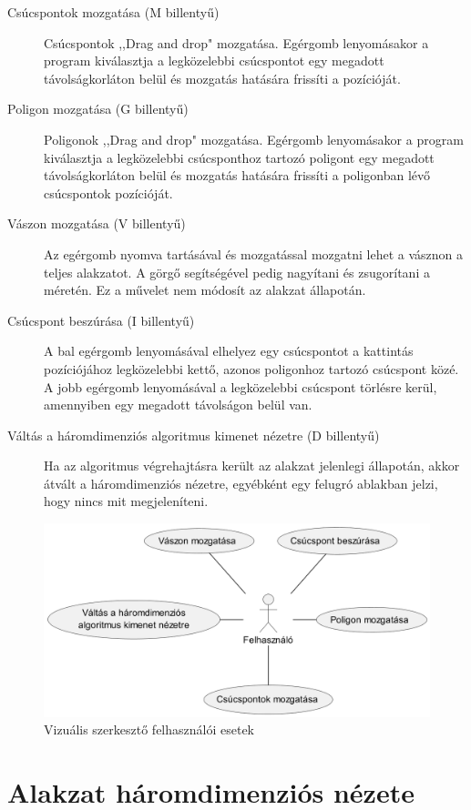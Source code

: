 \begin{description}
    \item[Csúcspontok mozgatása (M billentyű)] Csúcspontok ,,Drag and drop" mozgatása. Egérgomb lenyomásakor a program kiválasztja a legközelebbi csúcspontot egy megadott távolságkorláton belül és mozgatás hatására frissíti a pozícióját.
    \item[Poligon mozgatása (G billentyű)]  Poligonok ,,Drag and drop" mozgatása. Egérgomb lenyomásakor a program kiválasztja a legközelebbi csúcsponthoz tartozó poligont egy megadott távolságkorláton belül és mozgatás hatására frissíti a poligonban lévő csúcspontok pozícióját.
    \item[Vászon mozgatása (V billentyű)] Az egérgomb nyomva tartásával és mozgatással mozgatni lehet a vásznon a teljes alakzatot. A görgő segítségével pedig nagyítani és zsugorítani a méretén. Ez a művelet nem módosít az alakzat állapotán.
    \item[Csúcspont beszúrása (I billentyű)] A bal egérgomb lenyomásával elhelyez egy csúcspontot a kattintás pozíciójához legközelebbi kettő, azonos poligonhoz tartozó csúcspont közé. A jobb egérgomb lenyomásával a legközelebbi csúcspont törlésre kerül, amennyiben egy megadott távolságon belül van.
    \item[Váltás a háromdimenziós algoritmus kimenet nézetre (D billentyű)] Ha az algoritmus végrehajtásra került az alakzat jelenlegi állapotán, akkor átvált a háromdimenziós nézetre, egyébként egy felugró ablakban jelzi, hogy nincs mit megjeleníteni.
\end{description}

\begin{figure}[H]
    \centering
    \includegraphics[width=.7\linewidth]{images/usecase_visual_editor.png}
    \caption{Vizuális szerkesztő felhasználói esetek}
    \label{fig:usecase_visual_editor-1}
\end{figure}

\section{Alakzat háromdimenziós nézete}

